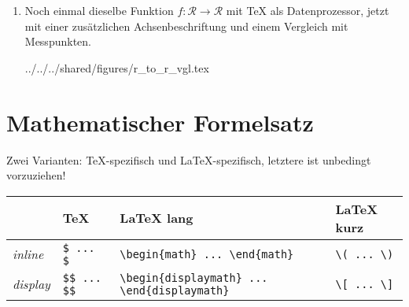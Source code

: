 \begin{enumerate}
    

  \item Noch einmal dieselbe Funktion
    \(f: \mathcal R \rightarrow \mathcal R\) mit \TeX{} als Datenprozessor,
    jetzt mit einer zusätzlichen Achsenbeschriftung und einem Vergleich mit
    Messpunkten.
\begin{verbatimwrite}{../../../shared/figures/r_to_r_vgl.tex}
\end{verbatimwrite}
    

    
\end{enumerate}


\section{Mathematischer Formelsatz}

Zwei Varianten: \TeX-spezifisch und \LaTeX-spezifisch, letztere ist unbedingt
vorzuziehen!

\begin{tabular}{llll}
  \toprule
  & \TeX & \LaTeX{} lang & \LaTeX{} kurz\\
  \midrule
  \textit{inline} & \lstinline|$ ... $| & \lstinline|\begin{math} ... \end{math}| & \lstinline|\( ... \)| \\
  \textit{display} & \lstinline|$$ ... $$| & \lstinline|\begin{displaymath} ... \end{displaymath}|& \lstinline|\[ ... \]| \\
  \bottomrule
\end{tabular}

